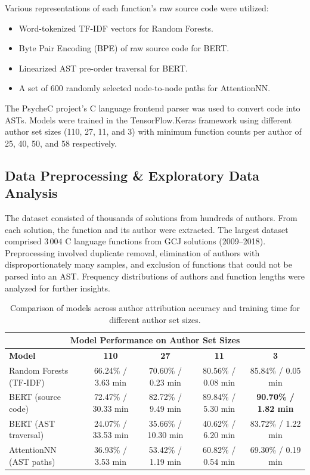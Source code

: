 \documentclass[conference]{IEEEtran}
\begin{document}
Various representations of each function’s raw source code were utilized:
\begin{itemize}
    \item Word-tokenized TF-IDF vectors for Random Forests.
    \item Byte Pair Encoding (BPE) of raw source code for BERT.
    \item Linearized AST pre-order traversal for BERT.
    \item A set of 600 randomly selected node-to-node paths for AttentionNN.
\end{itemize}
The PsycheC project's C language frontend parser \cite{psychec} was used to convert code into ASTs. Models were trained in the 
TensorFlow.Keras framework using different author set sizes (110, 27, 11, and 3) with minimum function counts per author of 25, 40, 50, and 58 respectively.

\subsection{Data Preprocessing \& Exploratory Data Analysis}

The dataset consisted of thousands of solutions from hundreds of authors. From each solution, the function and its author were extracted. 
The largest dataset comprised $3\,004$ C language functions from GCJ solutions (2009--2018). Preprocessing involved duplicate removal,
elimination of authors with disproportionately many samples, and exclusion of functions that could not be parsed into an AST. Frequency 
distributions of authors and function lengths were analyzed for further insights.


\begin{table}[!t]
    \renewcommand{\arraystretch}{1.3}
    \caption{Comparison of models across author attribution accuracy and training time for different author set sizes.}
    \label{tab:comparison}
    \centering
    \begin{tabular}{lcccc}
    \hline
    \multicolumn{5}{c}{\textbf{Model Performance on Author Set Sizes}} \\
    \hline
    \textbf{Model} & \textbf{110} & \textbf{27} & \textbf{11} & \textbf{3} \\
    \hline
    Random Forests (TF-IDF) & 66.24\% / 3.63 min & 70.60\% / 0.23 min & 80.56\% / 0.08 min & 85.84\% / 0.05 min \\
    BERT (source code)    & 72.47\% / 30.33 min & 82.72\% / 9.49 min & 89.84\% / 5.30 min  & \textbf{90.70\% / 1.82 min} \\
    BERT (AST traversal)  & 24.07\% / 33.53 min & 35.66\% / 10.30 min & 40.62\% / 6.20 min  & 83.72\% / 1.22 min \\
    AttentionNN (AST paths)& 36.93\% / 3.53 min  & 53.42\% / 1.19 min  & 60.82\% / 0.54 min  & 69.30\% / 0.19 min \\
    \hline
    \end{tabular}
\end{table}
\end{document}
